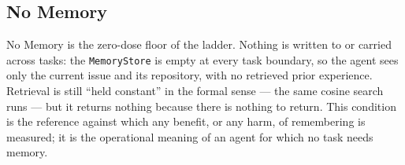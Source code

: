 
\subsection{No Memory}

No Memory is the zero-dose floor of the ladder. Nothing is written to or carried across
tasks: the \texttt{MemoryStore} is empty at every task boundary, so the agent sees only the
current issue and its repository, with no retrieved prior experience. Retrieval is still
``held constant'' in the formal sense --- the same cosine search runs --- but it returns
nothing because there is nothing to return. This condition is the reference against which
any benefit, or any harm, of remembering is measured; it is the operational meaning of an
agent for which no task needs memory.
